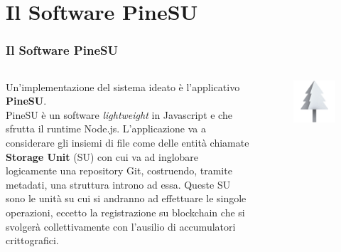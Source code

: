 \documentclass{beamer}
\begin{document}
\section{Il Software PineSU}
\begin{frame}
	\frametitle{Il Software PineSU}
	\begin{columns}
		Un'implementazione del sistema ideato è l'applicativo \textbf{PineSU}. \\
		PineSU è un software \emph{lightweight} in Javascript e che sfrutta il runtime Node.js.
		L'applicazione va a considerare gli insiemi di file come delle entità chiamate
		\textbf{Storage Unit} (SU) con cui va ad inglobare logicamente una repository Git,
		costruendo, tramite metadati, una struttura introno ad essa.
		Queste SU sono le unità su cui si andranno ad effettuare le singole
		operazioni, eccetto la registrazione su blockchain che si svolgerà
		collettivamente con l'ausilio di accumulatori crittografici. 
		\centering
		\begin{figure}
			\includegraphics[width=\textwidth]{figures/favicon.png}
		\end{figure} 
	\end{columns}
\end{frame}
\end{document}
